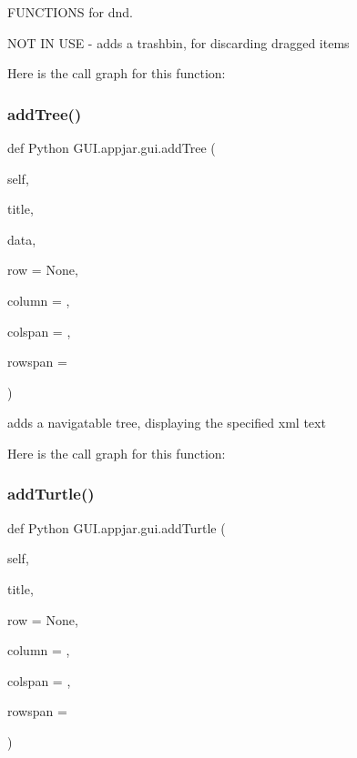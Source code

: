 F\+U\+N\+C\+T\+I\+O\+NS for dnd. 

\begin{DoxyVerb}NOT IN USE - adds a trashbin, for discarding dragged items \end{DoxyVerb}
 Here is the call graph for this function\+:
\mbox{\label{class_python_01_g_u_i_1_1appjar_1_1gui_a7c96e030cc769c3db0be0162f15dc3c8}} 
\subsubsection{\texorpdfstring{add\+Tree()}{addTree()}}
{\footnotesize\ttfamily def Python G\+U\+I.\+appjar.\+gui.\+add\+Tree (\begin{DoxyParamCaption}\item[{}]{self,  }\item[{}]{title,  }\item[{}]{data,  }\item[{}]{row = {\ttfamily None},  }\item[{}]{column = {},  }\item[{}]{colspan = {},  }\item[{}]{rowspan = {} }\end{DoxyParamCaption})}

\begin{DoxyVerb}adds a navigatable tree, displaying the specified xml text \end{DoxyVerb}
 Here is the call graph for this function\+:
\mbox{\label{class_python_01_g_u_i_1_1appjar_1_1gui_a09f467f40cfc1b81ec4567d7cacaa5c2}} 
\subsubsection{\texorpdfstring{add\+Turtle()}{addTurtle()}}
{\footnotesize\ttfamily def Python G\+U\+I.\+appjar.\+gui.\+add\+Turtle (\begin{DoxyParamCaption}\item[{}]{self,  }\item[{}]{title,  }\item[{}]{row = {\ttfamily None},  }\item[{}]{column = {},  }\item[{}]{colspan = {},  }\item[{}]{rowspan = {} }\end{DoxyParamCaption})}



